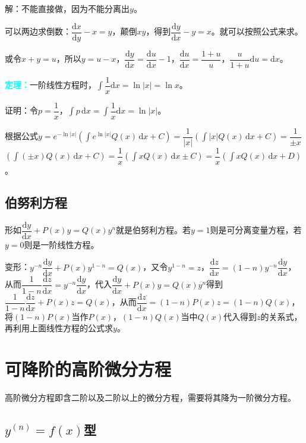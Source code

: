 \documentclass[UTF8, 12pt]{ctexart}
\begin{document}
解：不能直接做，因为不能分离出$y$。

可以两边求倒数：$\dfrac{\textrm{d}x}{\textrm{d}y}-x=y$，颠倒$xy$，得到$\dfrac{\textrm{d}y}{\textrm{d}x}-y=x$。就可以按照公式来求。

或令$x+y=u$，所以$y=u-x$，$\dfrac{\textrm{d}y}{\textrm{d}x}=\dfrac{\textrm{d}u}{\textrm{d}x}-1$，$\dfrac{\textrm{d}u}{\textrm{d}x}=\dfrac{1+u}{u}$，$\dfrac{u}{1+u}\textrm{d}u=\textrm{d}x$。

\textcolor{aqua}{\textbf{定理：}}一阶线性方程时，$\displaystyle{\int\dfrac{1}{x}\textrm{d}x}=\ln\vert x\vert=\ln x$。

证明：令$p=\dfrac{1}{x}$，$\int p\,\textrm{d}x=\displaystyle{\int\dfrac{1}{x}\textrm{d}x}=\ln\vert x\vert$。

根据公式$y=e^{-\ln\vert x\vert}(\int e^{\ln\vert x\vert}Q(x)\,\textrm{d}x+C)=\dfrac{1}{\vert x\vert}(\int\vert x\vert Q(x)\,\textrm{d}x+C)=\dfrac{1}{\pm x}$\\$(\int(\pm x)Q(x)\,\textrm{d}x+C)=\dfrac{1}{x}(\int xQ(x)\,\textrm{d}x\pm C)=\dfrac{1}{x}(\int xQ(x)\,\textrm{d}x+D)$。

\subsection{伯努利方程}

形如$\dfrac{\textrm{d}y}{\textrm{d}x}+P(x)y=Q(x)y^n$就是伯努利方程。若$y=1$则是可分离变量方程，若$y=0$则是一阶线性方程。

变形：$y^{-n}\dfrac{\textrm{d}y}{\textrm{d}x}+P(x)y^{1-n}=Q(x)$，又令$y^{1-n}=z$，$\dfrac{\textrm{d}z}{\textrm{d}x}=(1-n)y^{-n}\dfrac{\textrm{d}y}{\textrm{d}x}$，从而$\dfrac{1}{1-n}\dfrac{\textrm{d}z}{\textrm{d}x}=y^{-n}\dfrac{\textrm{d}y}{\textrm{d}x}$，代入$\dfrac{\textrm{d}y}{\textrm{d}x}+P(x)y=Q(x)y^n$得到$\dfrac{1}{1-n}\dfrac{\textrm{d}z}{\textrm{d}x}+P(x)z=Q(x)$，从而$\dfrac{\textrm{d}z}{\textrm{d}x}=(1-n)P(x)z=(1-n)Q(x)$，将$(1-n)P(x)$当作$P(x)$，$(1-n)Q(x)$当中$Q(x)$代入得到$z$的关系式，再利用上面线性方程的公式求$y$。

\section{可降阶的高阶微分方程}

高阶微分方程即含二阶以及二阶以上的微分方程，需要将其降为一阶微分方程。

\subsection{\texorpdfstring{$y^{(n)}=f(x)$}\ 型}
\end{document}
